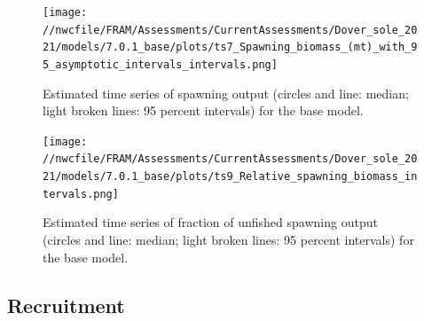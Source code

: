 \documentclass[11pt,
  english,
  a4paper,
]{article}
\begin{document}
\leavevmode\tagmcend\tagstructend\par




\begin{figure}
\centering
\texttt{[image: //nwcfile/FRAM/Assessments/CurrentAssessments/Dover\_sole\_2021/models/7.0.1\_base/plots/ts7\_Spawning\_biomass\_(mt)\_with\_95\_asymptotic\_intervals\_intervals.png]}
\caption{Estimated time series of spawning output (circles and line: median; light broken lines: 95 percent intervals) for the base model.\label{fig:es-ssb}}
\end{figure}

\tagmcend\tagstructend


\begin{figure}
\centering
\texttt{[image: //nwcfile/FRAM/Assessments/CurrentAssessments/Dover\_sole\_2021/models/7.0.1\_base/plots/ts9\_Relative\_spawning\_biomass\_intervals.png]}
\caption{Estimated time series of fraction of unfished spawning output (circles and line: median; light broken lines: 95 percent intervals) for the base model.\label{fig:es-depl}}
\end{figure}

\tagmcend\tagstructend


\hypertarget{recruitment}{%
\subsection*{Recruitment}\label{recruitment}}

\leavevmode\tagmcend\tagstructend

\end{document}
